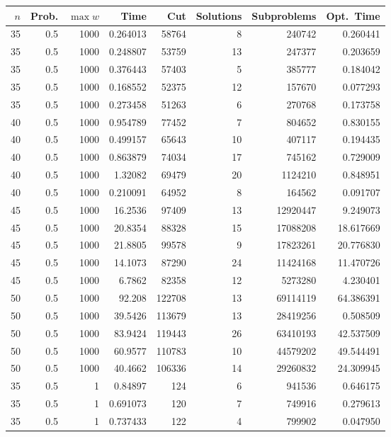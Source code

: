 \documentclass[a4paper,11pt]{article}
\begin{document}
\begin{table}
\begin{center}
\begin{tabular}{|rrr|r|r|rr|r|}
\hline
$n$ & Prob. & $\max w$ & Time & Cut & Solutions & Subproblems & Opt.\ Time \\
\hline
35 & 0.5 & 1000 & 0.264013 & 58764 & 8 & 240742 & 0.260441 \\
35 & 0.5 & 1000 & 0.248807 & 53759 & 13 & 247377 & 0.203659 \\
35 & 0.5 & 1000 & 0.376443 & 57403 & 5 & 385777 & 0.184042 \\
35 & 0.5 & 1000 & 0.168552 & 52375 & 12 & 157670 & 0.077293 \\
35 & 0.5 & 1000 & 0.273458 & 51263 & 6 & 270768 & 0.173758 \\
40 & 0.5 & 1000 & 0.954789 & 77452 & 7 & 804652 & 0.830155 \\
40 & 0.5 & 1000 & 0.499157 & 65643 & 10 & 407117 & 0.194435 \\
40 & 0.5 & 1000 & 0.863879 & 74034 & 17 & 745162 & 0.729009 \\
40 & 0.5 & 1000 & 1.32082 & 69479 & 20 & 1124210 & 0.848951 \\
40 & 0.5 & 1000 & 0.210091 & 64952 & 8 & 164562 & 0.091707 \\
45 & 0.5 & 1000 & 16.2536 & 97409 & 13 & 12920447 & 9.249073 \\
45 & 0.5 & 1000 & 20.8354 & 88328 & 15 & 17088208 & 18.617669 \\
45 & 0.5 & 1000 & 21.8805 & 99578 & 9 & 17823261 & 20.776830 \\
45 & 0.5 & 1000 & 14.1073 & 87290 & 24 & 11424168 & 11.470726 \\
45 & 0.5 & 1000 & 6.7862 & 82358 & 12 & 5273280 & 4.230401 \\
50 & 0.5 & 1000 & 92.208 & 122708 & 13 & 69114119 & 64.386391 \\
50 & 0.5 & 1000 & 39.5426 & 113679 & 13 & 28419256 & 0.508509 \\
50 & 0.5 & 1000 & 83.9424 & 119443 & 26 & 63410193 & 42.537509 \\
50 & 0.5 & 1000 & 60.9577 & 110783 & 10 & 44579202 & 49.544491 \\
50 & 0.5 & 1000 & 40.4662 & 106336 & 14 & 29260832 & 24.309945 \\
\hline
35 & 0.5 & 1 & 0.84897 & 124 & 6 & 941536 & 0.646175 \\
35 & 0.5 & 1 & 0.691073 & 120 & 7 & 749916 & 0.279613 \\
35 & 0.5 & 1 & 0.737433 & 122 & 4 & 799902 & 0.047950 \\

\end{tabular}
\end{center}
\end{table}
\end{document}
